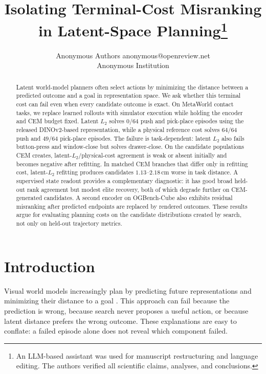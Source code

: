 \documentclass[10pt]{article}
\title{Isolating Terminal-Cost Misranking in Latent-Space Planning\thanks{An LLM-based assistant was
used for manuscript restructuring and language editing. The authors verified
all scientific claims, analyses, and conclusions.}}
\author{\name Anonymous Authors \email anonymous@openreview.net\\
  \addr Anonymous Institution}
\begin{document}
\raggedbottom
\maketitle

\begin{abstract}
Latent world-model planners often select actions by minimizing the distance
between a predicted outcome and a goal in representation space. We ask whether
this terminal cost can fail even when every candidate outcome is exact. On
MetaWorld contact tasks, we replace learned rollouts with simulator execution
while holding the encoder and CEM budget fixed. Latent $L_2$ solves $0/64$ push
and pick-place episodes using the released DINOv2-based representation, while a
physical reference cost solves $64/64$ push and $49/64$ pick-place episodes.
The failure is task-dependent: latent $L_2$ also fails button-press and
window-close but solves drawer-close. On the candidate populations CEM creates,
latent-$L_2$/physical-cost agreement is weak or absent initially and becomes
negative after refitting. In matched CEM branches that differ only in refitting
cost, latent-$L_2$ refitting produces candidates $1.13$--$2.18$\,cm worse in
task distance. A supervised state readout provides a complementary diagnostic:
it has good broad held-out rank agreement but modest elite recovery, both of
which degrade further on CEM-generated candidates. A second encoder on
OGBench-Cube also exhibits residual misranking after predicted endpoints are
replaced by rendered outcomes. These results argue for evaluating planning
costs on the candidate distributions created by search, not only on held-out
trajectory metrics.
\end{abstract}

\section{Introduction}

Visual world models increasingly plan by predicting future representations and
minimizing their distance to a goal
\citep{zhou2024dinowm,jepawms2025,maes2026lewm}. This approach can fail because
the prediction is wrong, because search never proposes a useful action, or
because latent distance prefers the wrong outcome. These explanations are easy
to conflate: a failed episode alone does not reveal which component failed.
\end{document}
